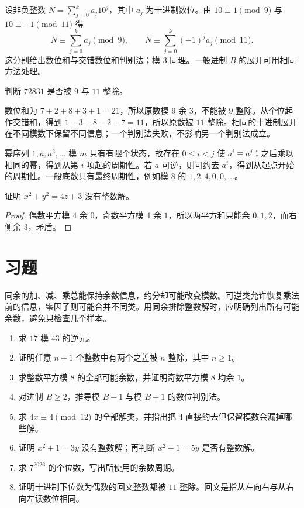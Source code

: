 \documentclass[UTF8,12pt,a4paper,fontset=fandol]{ctexbook}
\begin{document}
设非负整数 $N=\sum_{j=0}^k a_j10^j$，其中 $a_j$ 为十进制数位。由 $10\equiv1\pmod9$ 与 $10\equiv-1\pmod{11}$ 得
\[
 N\equiv\sum_{j=0}^k a_j\pmod9,\qquad
 N\equiv\sum_{j=0}^k(-1)^ja_j\pmod{11}.
\]
这分别给出数位和与交错数位和判别法；模 $3$ 同理。一般进制 $B$ 的展开可用相同方法处理。

\begin{example}[用不同模数检查同一个整数]
判断 $72831$ 是否被 $9$ 与 $11$ 整除。
\end{example}
\begin{solve}
数位和为 $7+2+8+3+1=21$，所以原数模 $9$ 余 $3$，不能被 $9$ 整除。从个位起作交错和，得到 $1-3+8-2+7=11$，所以原数被 $11$ 整除。相同的十进制展开在不同模数下保留不同信息；一个判别法失败，不影响另一个判别法成立。
\end{solve}

幂序列 $1,a,a^2,\ldots$ 模 $m$ 只有有限个状态，故存在 $0\le i<j$ 使 $a^i\equiv a^j$；之后乘以相同的幂，得到从第 $i$ 项起的周期性。若 $a$ 可逆，则可约去 $a^i$，得到从起点开始的周期性。一般底数只有最终周期性，例如模 $8$ 的 $1,2,4,0,0,\ldots$。

\begin{example}
证明 $x^2+y^2=4z+3$ 没有整数解。
\end{example}
\begin{proof}
偶数平方模 $4$ 余 $0$，奇数平方模 $4$ 余 $1$，所以两平方和只能余 $0,1,2$，而右侧余 $3$，矛盾。
\end{proof}

\section{习题}

同余的加、减、乘总能保持余数信息，约分却可能改变模数。可逆类允许恢复乘法前的信息，零因子则可能合并不同类。用同余排除整数解时，应明确列出所有可能余数，避免只检查几个样本。

\begin{enumerate}
 \item 求 $17$ 模 $43$ 的逆元。
 \item 证明任意 $n+1$ 个整数中有两个之差被 $n$ 整除，其中 $n\ge1$。
 \item 求整数平方模 $8$ 的全部可能余数，并证明奇数平方模 $8$ 均余 $1$。
 \item 对进制 $B\ge2$，推导模 $B-1$ 与模 $B+1$ 的数位判别法。
 \item\label{ex:cong-cancel} 求 $4x\equiv4\pmod{12}$ 的全部解类，并指出把 $4$ 直接约去但保留模数会漏掉哪些解。
 \item\label{ex:cong-obstruction} 证明 $x^2+1=3y$ 没有整数解；再判断 $x^2+1=5y$ 是否有整数解。
 \item\label{ex:cong-last-digit} 求 $7^{2026}$ 的个位数，写出所使用的余数周期。
 \item\label{ex:cong-palindrome} 证明十进制下位数为偶数的回文整数都被 $11$ 整除。回文是指从左向右与从右向左读数位相同。
\end{enumerate}
\end{document}
